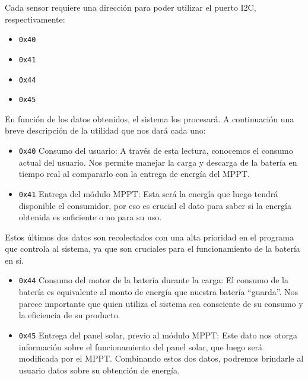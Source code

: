                 Cada sensor requiere una dirección para poder utilizar el puerto I2C, respectivamente:\par

                \begin{itemize} [label=•]
                    \setlength{\itemindent}{1.5em}
                    
                    \item \texttt{0x40}
                    \item \texttt{0x41}
                    \item \texttt{0x44}
                    \item \texttt{0x45}
                \end{itemize}
                
                En función de los datos obtenidos, el sistema los procesará. A continuación una breve descripción de la utilidad que nos dará cada uno:\par

                \begin{itemize} [label=•]
                    \setlength{\itemindent}{1.5em}
                    
                    \item \texttt{0x40} Consumo del usuario: A través de esta lectura, conocemos el consumo actual del usuario. Nos permite manejar la carga y descarga de la batería en tiempo real al compararlo con la entrega de energía del MPPT.
                    \item \texttt{0x41} Entrega del módulo MPPT: Esta será la energía que luego tendrá disponible el consumidor, por eso es crucial el dato para saber si la energía obtenida es suficiente o no para su uso.
                \end{itemize}
                
                Estos últimos dos datos son recolectados con una alta prioridad en el programa que controla al sistema, ya que son cruciales para el funcionamiento de la batería en sí.\par
                
                \begin{itemize} [label=•]
                    \setlength{\itemindent}{1.5em}
        
                    \item \texttt{0x44} Consumo del motor de la batería durante la carga: El consumo de la batería es equivalente al monto de energía que nuestra batería “guarda”. Nos parece importante que quien utiliza el sistema sea consciente de su consumo y la eficiencia de su producto.
                    \item \texttt{0x45} Entrega del panel solar, previo al módulo MPPT: Este dato nos otorga información sobre el funcionamiento del panel solar, que luego será modificada por el MPPT. Combinando estos dos datos, podremos brindarle al usuario datos sobre su obtención de energía.
                \end{itemize}
                
